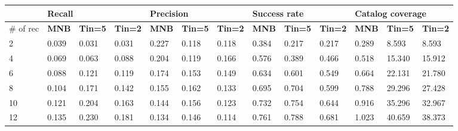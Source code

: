 \begin{table}[]
	\small
	\begin{tabular}{|l | lll| lll |lll |lll|}
		\hline
		& \multicolumn{3}{l|}{\textbf{Recall}} & \multicolumn{3}{l|}{\textbf{Precision}} & \multicolumn{3}{l|}{\textbf{Success rate}} & \multicolumn{3}{l|}{ \textbf{Catalog coverage}} \\ \hline
		\# of rec  & \textbf{MNB}     & \textbf{Tin=5}   & \textbf{Tin=2}  & \textbf{MNB}      & \textbf{Tin=5 }   & \textbf{Tin=2}   & \textbf{MNB}       & \textbf{Tin=5 }   & \textbf{Tin=2}    & \textbf{MNB}        & \textbf{Tin=5 }     & \textbf{Tin=2}      \\ \hline
		2  & 0.039   & 0.031   & 0.031  & 0.227    & 0.118    & 0.118   & 0.384     & 0.217    & 0.217    & 0.289     & 8.593      & 8.593      \\ \hline
		4  & 0.069   & 0.063   & 0.088  & 0.204   & 0.119    & 0.166   & 0.576     & 0.389    & 0.466    & 0.518     & 15.340     & 15.912     \\ \hline
		6  & 0.088   & 0.121   & 0.119  & 0.174    & 0.153    & 0.149   & 0.634     & 0.601    & 0.549    & 0.664     & 22.131     & 21.780     \\ \hline
		8  & 0.104   & 0.171   & 0.142  & 0.155   & 0.162    & 0.133   &  0.695     & 0.704    & 0.599    & 0.788     & 29.296     & 27.428     \\ \hline
		10 & 0.121   & 0.204   & 0.163  & 0.144    & 0.156    & 0.123   & 0.732     & 0.754    & 0.644    & 0.916     & 35.296     & 32.967     \\ \hline
		12 & 0.135   & 0.230   & 0.181  & 0.134    & 0.146    &  0.114   & 0.761     & 0.788    & 0.681    & 1.023     & 40.659     & 38.373     \\ \hline

\end{tabular}
\end{table}
